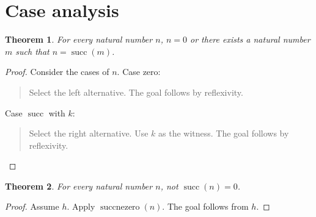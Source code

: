 \documentclass[11pt]{article}
\newtheorem{theorem}{Theorem}[section]
\theoremstyle{definition}
\begin{document}
\section{Case analysis}
\label{ll:order:case-analysis}
\begin{theorem}
\label{ll:order:zero-or-successor}
For every natural number \(n\), \(n = 0\) or there exists a natural number \(m\) such that \(n = \operatorname{succ}(m)\).
\end{theorem}
\begin{proof}
Consider the cases of \(n\).
Case zero:
\begin{quote}
Select the left alternative.
The goal follows by reflexivity.
\end{quote}
Case \(\operatorname{succ}\) with \(k\):
\begin{quote}
Select the right alternative.
Use \(k\) as the witness.
The goal follows by reflexivity.
\end{quote}
\end{proof}
\begin{theorem}
\label{ll:order:successor-not-zero}
For every natural number \(n\), not \(\operatorname{succ}(n) = 0\).
\end{theorem}
\begin{proof}
Assume \(h\).
Apply \(\operatorname{succnezero}(n)\).
The goal follows from \(h\).
\end{proof}
\end{document}

